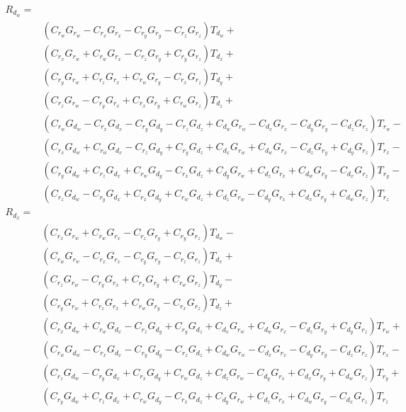 \documentclass[12pt]{article}
\begin{document}
	\begin{equation}
		\begin{split}
			R_{d_w} = \\&
			(C_{r_w} G_{r_w} - C_{r_x} G_{r_x} - C_{r_y} G_{r_y} - 
			C_{r_z} G_{r_z}) T_{d_w} +\\& (C_{r_x} G_{r_w} + 
			C_{r_w} G_{r_x} - C_{r_z} G_{r_y} + 
			C_{r_y} G_{r_z}) T_{d_x} + \\&(C_{r_y} G_{r_w} + 
			C_{r_z} G_{r_x} + C_{r_w} G_{r_y} - 
			C_{r_x} G_{r_z}) T_{d_y} +\\& (C_{r_z} G_{r_w} - 
			C_{r_y} G_{r_x} + C_{r_x} G_{r_y} + 
			C_{r_w} G_{r_z}) T_{d_z} +\\& (C_{r_w} G_{d_w} - 
			C_{r_x} G_{d_x} - C_{r_y} G_{d_y} - C_{r_z} G_{d_z} + 
			C_{d_w} G_{r_w} - C_{d_x} G_{r_x} - C_{d_y} G_{r_y} - 
			C_{d_z} G_{r_z}) T_{r_w} -\\& (C_{r_x} G_{d_w} + 
			C_{r_w} G_{d_x} - C_{r_z} G_{d_y} + C_{r_y} G_{d_z} + 
			C_{d_x} G_{r_w} + C_{d_w} G_{r_x} - C_{d_z} G_{r_y} + 
			C_{d_y} G_{r_z}) T_{r_x} -\\& (C_{r_y} G_{d_w} + 
			C_{r_z} G_{d_x} + C_{r_w} G_{d_y} - C_{r_x} G_{d_z} + 
			C_{d_y} G_{r_w} + C_{d_z} G_{r_x} + C_{d_w} G_{r_y} - 
			C_{d_x} G_{r_z}) T_{r_y} - \\&(C_{r_z} G_{d_w} - 
			C_{r_y} G_{d_x} + C_{r_x} G_{d_y} + C_{r_w} G_{d_z} + 
			C_{d_z} G_{r_w} - C_{d_y} G_{r_x} + C_{d_x} G_{r_y} + 
			C_{d_w} G_{r_z}) T_{r_z}
		\end{split}
	\end{equation}
	\begin{equation}
		\begin{split}
			R_{d_x} = \\&
			(C_{r_x} G_{r_w} + 
			C_{r_w} G_{r_x} - C_{r_z} G_{r_y} + 
			C_{r_y} G_{r_z}) T_{d_w} -\\& (C_{r_w} G_{r_w} - 
			C_{r_x} G_{r_x} - C_{r_y} G_{r_y} - 
			C_{r_z} G_{r_z}) T_{d_x} +\\& (C_{r_z} G_{r_w} - 
			C_{r_y} G_{r_x} + C_{r_x} G_{r_y} + 
			C_{r_w} G_{r_z}) T_{d_y} - \\&(C_{r_y} G_{r_w} + 
			C_{r_z} G_{r_x} + C_{r_w} G_{r_y} - 
			C_{r_x} G_{r_z}) T_{d_z} +\\& (C_{r_x} G_{d_w} + 
			C_{r_w} G_{d_x} - C_{r_z} G_{d_y} + C_{r_y} G_{d_z} + 
			C_{d_x} G_{r_w} + C_{d_w} G_{r_x} - C_{d_z} G_{r_y} + 
			C_{d_y} G_{r_z}) T_{r_w} + \\&(C_{r_w} G_{d_w} - 
			C_{r_x} G_{d_x} - C_{r_y} G_{d_y} - C_{r_z} G_{d_z} + 
			C_{d_w} G_{r_w} - C_{d_x} G_{r_x} - C_{d_y} G_{r_y} - 
			C_{d_z} G_{r_z}) T_{r_x} - \\&(C_{r_z} G_{d_w} - 
			C_{r_y} G_{d_x} + C_{r_x} G_{d_y} + C_{r_w} G_{d_z} + 
			C_{d_z} G_{r_w} - C_{d_y} G_{r_x} + C_{d_x} G_{r_y} + 
			C_{d_w} G_{r_z}) T_{r_y} + \\&(C_{r_y} G_{d_w} + 
			C_{r_z} G_{d_x} + C_{r_w} G_{d_y} - C_{r_x} G_{d_z} + 
			C_{d_y} G_{r_w} + C_{d_z} G_{r_x} + C_{d_w} G_{r_y} - 
			C_{d_x} G_{r_z}) T_{r_z}
		\end{split}
	\end{equation}
\end{document}
